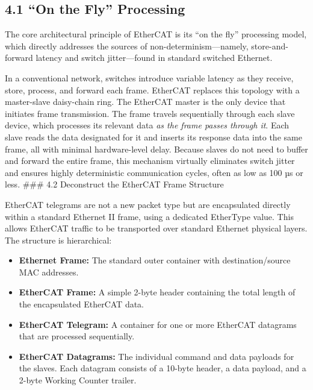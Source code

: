 \documentclass[a4paper, 12pt]{book} %
\begin{document}
\subsection{4.1 ``On the Fly'' Processing}\label{on-the-fly-processing}

The core architectural principle of EtherCAT is its ``on the fly''
processing model, which directly addresses the sources of
non-determinism---namely, store-and-forward latency and switch
jitter---found in standard switched Ethernet.

In a conventional network, switches introduce variable latency as they
receive, store, process, and forward each frame. EtherCAT replaces this
topology with a master-slave daisy-chain ring. The EtherCAT master is
the only device that initiates frame transmission. The frame travels
sequentially through each slave device, which processes its relevant
data \emph{as the frame passes through it}. Each slave reads the data
designated for it and inserts its response data into the same frame, all
with minimal hardware-level delay. Because slaves do not need to buffer
and forward the entire frame, this mechanism virtually eliminates switch
jitter and ensures highly deterministic communication cycles, often as
low as 100 µs or less.
\#\#\# 4.2 Deconstruct the EtherCAT Frame Structure

EtherCAT telegrams are not a new packet type but are encapsulated
directly within a standard Ethernet II frame, using a dedicated
EtherType value. This allows EtherCAT traffic to be transported over
standard Ethernet physical layers. The structure is hierarchical:

\begin{itemize}
\tightlist
\item
  \textbf{Ethernet Frame:} The standard outer container with
  destination/source MAC addresses.
\item
  \textbf{EtherCAT Frame:} A simple 2-byte header containing the total
  length of the encapsulated EtherCAT data.
\item
  \textbf{EtherCAT Telegram:} A container for one or more EtherCAT
  datagrams that are processed sequentially.
\item
  \textbf{EtherCAT Datagrams:} The individual command and data payloads
  for the slaves. Each datagram consists of a 10-byte header, a data
  payload, and a 2-byte Working Counter trailer.
\end{itemize}
\end{document}
